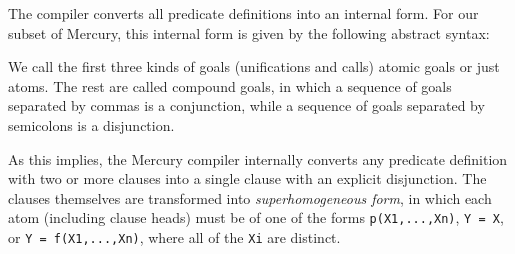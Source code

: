 \documentclass{tlp}
\newcommand{\code}[1]{{\tt#1}}
\begin{document}
The compiler converts all predicate definitions into an internal form.
For our subset of Mercury,
this internal form is given by the following abstract syntax:

We call the first three kinds of goals (unifications and calls)
atomic goals or just atoms.
The rest are called compound goals, in which
a sequence of goals separated by commas is a conjunction, while
a sequence of goals separated by semicolons is a disjunction.

As this implies, the Mercury compiler internally converts
any predicate definition with two or more clauses
into a single clause with an explicit disjunction.
The clauses themselves are transformed into \emph{superhomogeneous form},
in which each atom (including clause heads) must be of one of the forms
\code{p(X1,...,Xn)}, \code{Y = X}, or \code{Y = f(X1,...,Xn)},
where all of the \code{Xi} are distinct.
\end{document}
